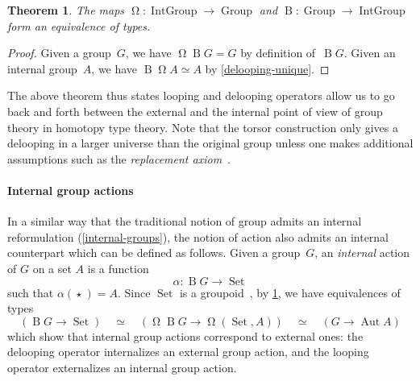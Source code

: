 \documentclass[10pt,a4paper]{amsart}
\newtheorem{theorem}{Theorem}
\theoremstyle{definition}
\newcommand{\B}{\operatorname{B}} %
\newcommand{\pt}[1]{\star_{#1}} %
\newcommand{\equivto}{\simeq} %
\newcommand{\Aut}{\operatorname{Aut}} %
\newcommand{\Loop}{\operatorname{\Omega}} %
\newcommand{\Set}{\operatorname{Set}} %
\newcommand{\Group}{\operatorname{Group}} %
\newcommand{\IGroup}[1][1]{\operatorname{IntGroup}} %
\newcommand{\TODO}[1]{\marginpar{\tiny #1}}
\newcommand{\EO}[1]{\TODO{EO: #1}}
\begin{document}

\begin{theorem}
  \label{internal-external-equivalence}
  The maps $\Loop:\IGroup\to\Group$ and $\B:\Group\to\IGroup$ form an
  equivalence of types.
\end{theorem}
\begin{proof}
  Given a group~$G$, we have $\Loop\B G=G$ by definition of~$\B G$. Given an
  internal group~$A$, we have $\B\Loop A\simeq A$ by \cref{delooping-unique}.
\end{proof}

\noindent
The above theorem thus states looping and delooping operators allow us to go
back and forth between the external and the internal point of view of group
theory in homotopy type theory. Note that the torsor construction only gives a
delooping in a larger universe than the original group unless one makes
additional assumptions such as the \emph{replacement
  axiom}~\cite[Axiom~18.1.8]{rijke2022introduction}.


\paragraph{Internal group actions}
In a similar way that the traditional notion of group admits an internal
reformulation (\cref{internal-groups}), the notion of action also admits an
internal counterpart which can be defined as follows.
%
Given a group~$G$, an \emph{internal} action of $G$ on a set $A$ is a function
\[
  \alpha : \B G \to \Set
\]
such that $\alpha(\pt{})=A$. Since $\Set$ is a
groupoid~\cite[Theorem 7.1.11]{hottbook}, by
\cref{internal-external-equivalence}, we have equivalences of types
\[
  (\B G\to\Set)
  \quad\equivto\quad
  (\Loop\B G\to\Loop(\Set,A))
  \quad\equivto\quad
  (G\to\Aut A)
\]
which show that internal group actions correspond to external ones: the
delooping operator internalizes an external group action, and the looping
operator externalizes an internal group action.


\end{document}
